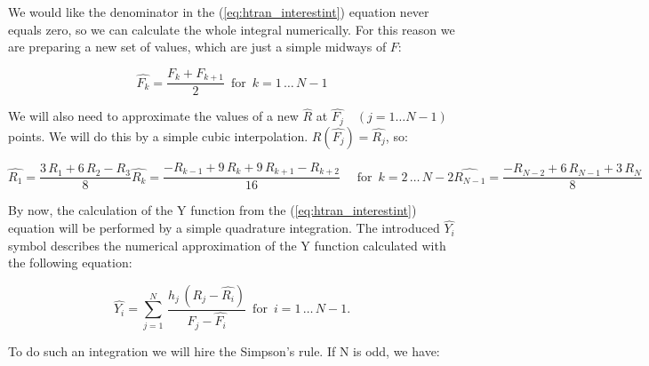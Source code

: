 \documentclass[12pt,twoside,a4paper]{article}
\numberwithin{equation}{subsection}
\numberwithin{figure}{subsection}
\begin{document}
We would like the denominator in the (\ref{eq:htran_interestint}) equation never equals zero, so we can calculate the whole integral numerically. For this reason we are preparing a new set of values, which are just a simple midways of $F$:

\begin{equation} \label{eq:htran_newpoints}
  \widehat{F_k}=\frac { F_k + F_{k + 1} }{2} \,\mbox{ for } \, k = 1 \, \ldots \, {N - 1}
\end{equation} 

We will also need to approximate the values of a new $\widehat{R}$ at $\widehat{F_j} \quad (j = 1 \ldots N-1)$  points. We will do this by a simple cubic interpolation. $R(\widehat{F_j}) = \widehat{R_j}$, so:

\begin{subequations} \label{eq:htran_r3interp}
  \begin{equation}   \label{eq:hr3inp_first}
    \widehat{R_1}     = \frac {3 \, R_1 + 6 \, R_2 - R_3}{8}
  \end{equation}
  \begin{equation}   \label{eq:hr3inp_next}
    \widehat{R_k}     = \frac { - R_{k - 1} + 9 \, R_k + 9 \, R_{k + 1} - R_{k + 2} }{16} 
                        \quad \mbox{ for } \, k = 2 \, \ldots \, {N - 2}
  \end{equation}
  \begin{equation}   \label{eq:hr3inp_last}
    \widehat{R_{N-1}} = \frac { - R_{N - 2} + 6 \, R_{N - 1} + 3 \, R_N}{8}
  \end{equation}
\end{subequations}

By now, the calculation of the $\mathrm{Y}$ function from the (\ref{eq:htran_interestint}) equation will be performed by a simple quadrature integration. The introduced $\widehat{Y_{i}}$ symbol describes the numerical approximation of the $\mathrm{Y}$ function calculated with the following equation:

\begin{equation} \label{eq:htran_simplequadrature}
  \widehat{Y_{i}} = \sum_{j=1}^{N} \, \frac {h_j \, (R_j - \widehat{R_i})} 
                                            {F_j - \widehat{F_i}} \, \mbox{ for } \, i = 1 \, \ldots \, {N - 1} .
\end{equation}

To do such an integration we will hire the Simpson's rule. If N is odd, we have:
\end{document}
